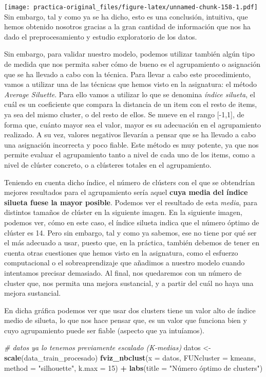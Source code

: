 \documentclass[spanish,]{article}
\newenvironment{Shaded}{\begin{snugshade}}{\end{snugshade}}
\newcommand{\KeywordTok}[1]{\textcolor[rgb]{0.13,0.29,0.53}{\textbf{#1}}}
\newcommand{\DataTypeTok}[1]{\textcolor[rgb]{0.13,0.29,0.53}{#1}}
\newcommand{\DecValTok}[1]{\textcolor[rgb]{0.00,0.00,0.81}{#1}}
\newcommand{\StringTok}[1]{\textcolor[rgb]{0.31,0.60,0.02}{#1}}
\newcommand{\CommentTok}[1]{\textcolor[rgb]{0.56,0.35,0.01}{\textit{#1}}}
\newcommand{\OperatorTok}[1]{\textcolor[rgb]{0.81,0.36,0.00}{\textbf{#1}}}
\newcommand{\NormalTok}[1]{#1}
\begin{document}
\texttt{[image: practica-original\_files/figure-latex/unnamed-chunk-158-1.pdf]}
Sin embargo, tal y como ya se ha dicho, esto es una conclusión,
intuitiva, que hemos obtenido nosotros gracias a la gran cantidad de
información que nos ha dado el preprocesamiento y estudio exploratorio
de los datos.

Sin embargo, para validar nuestro modelo, podemos utilizar también algún
tipo de medida que nos permita saber cómo de bueno es el agrupamiento o
asignación que se ha llevado a cabo con la técnica. Para llevar a cabo
este procedimiento, vamos a utilizar una de las técnicas que hemos visto
en la asignatura: el método \emph{Average Siluette}. Para ello vamos a
utilizar lo que se denomina \emph{índice silueta}, el cuál es un
coeficiente que compara la distancia de un item con el resto de items,
ya sea del mismo cluster, o del resto de ellos. Se mueve en el rango
{[}-1,1{]}, de forma que, cuánto mayor sea el valor, mayor es su
adecuación en el agrupamiento realizado. A su vez, valores negativos
llevarán a pensar que se ha llevado a cabo una asignación incorrecta y
poco fiable. Este método es muy potente, ya que nos permite evaluar el
agrupamiento tanto a nivel de cada uno de los items, como a nivel de
clúster concreto, o a clústeres totales en el agrupamiento.

Teniendo en cuenta dicho índice, el número de clústers con el que se
obtendrían mejores resultados para el agrupamiento sería aquel
\textbf{cuya media del índice silueta fuese la mayor posible}. Podemos
ver el resultado de esta \emph{media}, para distintos tamaños de clúster
en la siguiente imagen. En la siguiente imagen, podemos ver, cómo en
este caso, el índice silueta indica que el número óptimo de clúster es
14. Pero sin embargo, tal y como ya sabemos, ese no tiene por qué ser el
más adecuado a usar, puesto que, en la práctica, también debemos de
tener en cuenta otras cuestiones que hemos visto en la asignatura, como
el esfuerzo computacional o el sobreaprendizaje que añadimos a nuestro
modelo cuando intentamos precisar demasiado. Al final, nos quedaremos
con un número de cluster que, nos permita una mejora sustancial, y a
partir del cuál no haya una mejora sustancial.

En dicha gráfica podemos ver que usar dos clusters tiene un valor alto
de índice medio de silueta, lo que nos hace pensar que, es un valor que
funciona bien y cuyo agrupamiento puede ser fiable (aspecto que ya
intuíamos).

\begin{Shaded}
\begin{Highlighting}[]
\CommentTok{# datos ya lo tenemos previamente escalado (K-medias)}
\NormalTok{datos <-}\StringTok{ }\KeywordTok{scale}\NormalTok{(data_train_procesado)}
\KeywordTok{fviz_nbclust}\NormalTok{(}\DataTypeTok{x =}\NormalTok{ datos, }\DataTypeTok{FUNcluster =}\NormalTok{ kmeans, }\DataTypeTok{method =} \StringTok{"silhouette"}\NormalTok{, }\DataTypeTok{k.max =} \DecValTok{15}\NormalTok{) }\OperatorTok{+}
\StringTok{  }\KeywordTok{labs}\NormalTok{(}\DataTypeTok{title =} \StringTok{"Número óptimo de clusters"}\NormalTok{)}
\end{Highlighting}
\end{Shaded}
\end{document}
